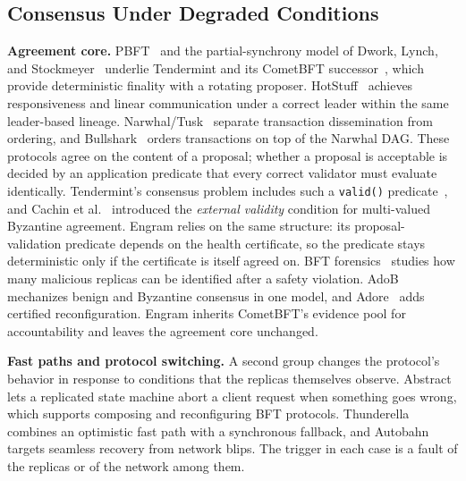 \subsection{Consensus Under Degraded Conditions}
\label{subsec:rw-degraded}
\textbf{Agreement core.}
PBFT~\cite{castro1999pbft} and the partial-synchrony model of Dwork, Lynch,
and Stockmeyer~\cite{dwork1988consensus} underlie Tendermint and its CometBFT
successor~\cite{buchman2016tendermint,buchman2018gossip}, which provide
deterministic finality with a rotating proposer. HotStuff~\cite{yin2019hotstuff}
achieves responsiveness and linear communication under a correct leader within the same
leader-based lineage. Narwhal/Tusk~\cite{danezis2022narwhal} separate
transaction dissemination from ordering, and Bullshark~\cite{spiegelman2022bullshark}
orders transactions on top of the Narwhal DAG. These protocols agree on the content of a proposal; whether
a proposal is acceptable is decided by an application predicate that every
correct validator must evaluate identically. Tendermint's consensus problem
includes such a \texttt{valid()} predicate~\cite{buchman2018gossip}, and Cachin
et al.~\cite{cachin2001secure} introduced the \emph{external validity}
condition for multi-valued Byzantine agreement. Engram relies on the
same structure: its proposal-validation predicate depends on the health
certificate, so the predicate stays deterministic only if the certificate is
itself agreed on. BFT forensics~\cite{sheng2021forensics} studies how many malicious replicas
can be identified after a safety violation. AdoB~\cite{honore2024adob}
mechanizes benign and Byzantine consensus in one model, and
Adore~\cite{honore2022adore} adds certified reconfiguration. Engram inherits
CometBFT's evidence pool for accountability and leaves the agreement core
unchanged.

\textbf{Fast paths and protocol switching.}
A second group changes the protocol's behavior in response to conditions that
the replicas themselves observe. Abstract~\cite{aublin2015next700} lets a replicated
state machine abort a client request when something goes wrong, which supports
composing and reconfiguring BFT protocols. Thunderella~\cite{pass2018thunderella} combines an
optimistic fast path with a synchronous fallback, and
Autobahn~\cite{giridharan2024autobahn} targets seamless recovery from network
blips. The trigger in each case is a fault of the replicas or of the network
among them.

